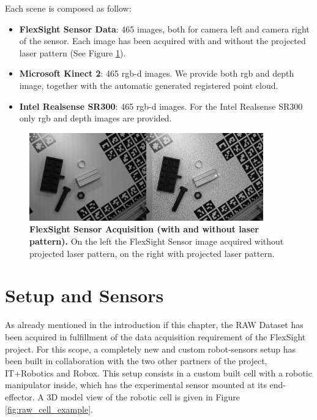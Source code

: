 Each scene is composed as follow:

\begin{itemize}
	\item \textbf{FlexSight Sensor Data}: 465 images, both for camera left and camera right of the sensor. Each image has been acquired with and without the projected laser pattern (See Figure \ref{fig:flexsight_laser_no_laser_ex}).
	\item \textbf{Microsoft Kinect 2}: 465 rgb-d images. We provide both rgb and depth image, together with the automatic generated registered point cloud.
	\item \textbf{Intel Realsense SR300}: 465 rgb-d images. For the Intel Realsense SR300 only rgb and depth images are provided.
\end{itemize}

\begin{figure}
    \centering
    \includegraphics[width=0.9\textwidth]{figures/3_raw_dataset/flexsight_laser_no_laser_ex}
    \caption{\textbf{FlexSight Sensor Acquisition (with and without laser pattern).} On the left the FlexSight Sensor image acquired without projected laser pattern, on the right with projected laser pattern.}
    \label{fig:flexsight_laser_no_laser_ex}
\end{figure}

\section{Setup and Sensors}\label{sec:raw_setup_and_sensors}
As already mentioned in the introduction if this chapter, the RAW Dataset has been acquired in fulfillment of the data acquisition requirement of the FlexSight project. For this scope, a completely new and custom robot-sensors setup has been built in collaboration with the two other partners of the project, IT+Robotics and Robox. This setup consists in a custom built cell with a robotic manipulator inside, which has the experimental sensor mounted at its end-effector. A 3D model view of the robotic cell is given in Figure \ref{fig:raw_cell_example}.

